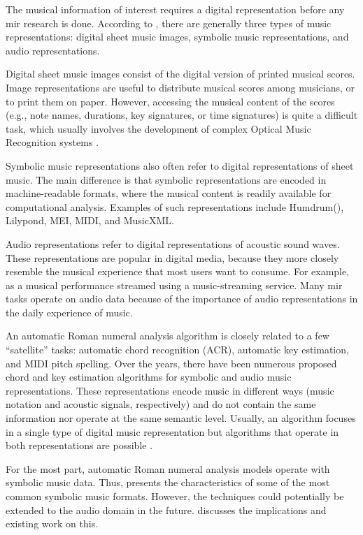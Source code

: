 


The musical information of interest requires a digital
representation before any \gls{mir} research is done.
According to \textcite{muller2015music}, there are generally
three types of music representations: digital sheet music
images, symbolic music representations, and audio
representations.

Digital sheet music images consist of the digital version of
printed musical scores. Image representations are useful to
distribute musical scores among musicians, or to print them
on paper. However, accessing the musical content of the
scores (e.g., note names, durations, key signatures, or time
signatures) is quite a difficult task, which usually
involves the development of complex Optical Music
Recognition systems
\parencite{calvozaragoza2020understanding}.

Symbolic music representations also often refer to digital
representations of sheet music. The main difference is that
symbolic representations are encoded in machine-readable
formats, where the musical content is readily available for
computational analysis. Examples of such representations
include Humdrum(), Lilypond, MEI, MIDI, and
MusicXML.

Audio representations refer to digital representations of
acoustic sound waves. These representations are popular in
digital media, because they more closely resemble the
musical experience that most users want to consume. For
example, as a musical performance streamed using a
music-streaming service. Many \gls{mir} tasks operate on
audio data because of the importance of audio
representations in the daily experience of music.

An automatic Roman numeral analysis algorithm is closely
related to a few ``satellite'' tasks: automatic chord
recognition (ACR), automatic key estimation, and MIDI pitch
spelling. Over the years, there have been numerous proposed
chord and key estimation algorithms for symbolic and audio
music representations. These representations encode music in
different ways (music notation and acoustic signals,
respectively) and do not contain the same information nor
operate at the same semantic level. Usually, an algorithm
focuses in a single type of digital music representation but
algorithms that operate in both representations are possible
\parencite{napoleslopez2019keyfinding}.

For the most part, automatic Roman numeral analysis models
operate with symbolic music data. Thus,
 presents the
characteristics of some of the most common symbolic music
formats. However, the techniques could potentially be
extended to the audio domain in the future.
 discusses the
implications and existing work on this.
